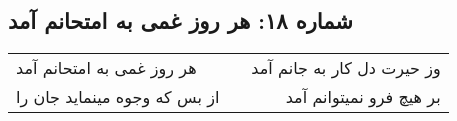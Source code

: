 \begin{center}
\section*{شماره ۱۸: هر روز غمی به امتحانم آمد}
\label{sec:018}
\begin{longtable}{l p{0.5cm} r}
هر روز غمی به امتحانم آمد
&&
وز حیرت دل کار به جانم آمد
\\
از بس که وجوه مینماید جان را
&&
بر هیچ فرو نمیتوانم آمد
\\
\end{longtable}
\end{center}
